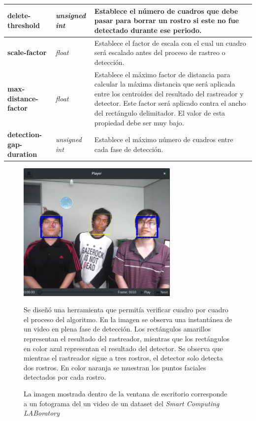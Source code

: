 \documentclass[a4paper,openright,12pt]{report}
\begin{document}
\begin{center}
\begin{longtable}{| p{} | p{} | p{} |}
  \textbf{delete-threshold} &
  \textit{unsigned int} &
  Establece el número de cuadros que debe pasar para borrar un rostro si este
  no fue detectado durante ese periodo.
  \\ \hline

  \textbf{scale-factor} &
  \textit{float} &
  Establece el factor de escala con el cual un cuadro será escalado antes del
  proceso de rastreo o detección.
  \\ \hline

  \textbf{max-distance-factor} &
  \textit{float} &
  Establece el máximo factor de distancia para calcular la máxima distancia que
  será aplicada entre los centroides del resultado del rastreador y detector.
  Este factor será aplicado contra el ancho del rectángulo delimitador. El valor
  de esta propiedad debe ser muy bajo.
  \\ \hline


  \textbf{detection-gap-duration} &
  \textit{unsigned int} &
  Establece el máximo número de cuadros entre cada fase de detección.
  \\ \hline
  \end{longtable}
\end{center}

\begin{figure}[!h]
  \centering
    \includegraphics[width=0.7\textwidth]{../images/stepper1.png}\par
  \caption{Se diseñó una herramienta que permitía verificar cuadro por cuadro
           el proceso del algoritmo. En la imagen se observa una instantánea
           de un video en plena fase de detección. Los rectángulos amarillos
           representan el resultado del rastreador, mientras que los rectángulos
           en color azul representan el resultado del detector. Se observa
           que mientras el rastreador sigue a tres rostros, el detector solo
           detecta dos rostros. En color naranja se muestran los puntos faciales
           detectados por cada rostro.}
    \label{fig:stepper-1}
  \caption*{La imagen mostrada dentro de la ventana de escritorio corresponde a
            un fotograma del un video de un dataset del
            \textit{Smart Computing LABoratory} \cite{chonnamDataset}}
\end{figure}
\end{document}
